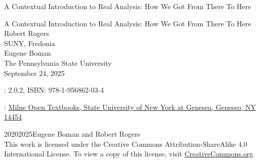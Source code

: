 \documentclass[oneside,10pt,]{book}
\newcommand{\titlepagefont}{\relax}
\numberwithin{equation}{part}
\begin{document}
\raggedbottom
\frontmatter
\thispagestyle{empty}
{\titlepagefont\centering
\vspace*{0.28\textheight}
{\Huge A Contextual Introduction to Real Analysis: How We Got From There To Here}\\}
\clearpage
\thispagestyle{empty}
{\titlepagefont\centering
\vspace*{0.14\textheight}
{\Huge A Contextual Introduction to Real Analysis: How We Got From There To Here}\\[3\baselineskip]
{\Large Robert Rogers}\\[0.5\baselineskip]
{\Large SUNY, Fredonia}\\[3\baselineskip]
{\Large Eugene Boman}\\[0.5\baselineskip]
{\Large The Pennsylvania State University}\\[3\baselineskip]
{\Large September 24, 2025}\\}
\clearpage
\thispagestyle{empty}
\hypertarget{front-colophon}{}
: 2.0.2, ISBN: 978-1-956862-03-4\par\medskip
{}: \href{https://knightscholar.geneseo.edu/oer-ost/20/}{Milne Open Textbooks, State University of New York at Geneseo, Geneseo, NY 14454}\par\medskip
\noindent\textcopyright{}2020\textendash{}2025\quad{}Eugene Boman and Robert Rogers\\[0.5\baselineskip]
This work is licensed under the Creative Commons Attribution-ShareAlike 4.0 International License.  To view a copy of this license, visit \href{http://creativecommons.org/licenses/by-nc/4.0/}{CreativeCommons.org}\par\medskip
{}
\null\clearpage
%
%
\typeout{************************************************}
\typeout{************************************************}
%
\end{document}
